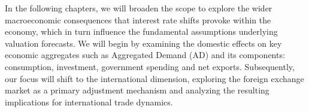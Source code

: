 In the following chapters, we will broaden the scope to explore the wider macroeconomic consequences that interest rate shifts provoke within the economy, which in turn influence the fundamental assumptions underlying valuation forecasts. We will begin by examining the domestic effects on key economic aggregates such as Aggregated Demand (AD) and its components: consumption, investment, government spending and net exports. Subsequently, our focus will shift to the international dimension, exploring the foreign exchange market as a primary adjustment mechanism and analyzing the resulting implications for international trade dynamics.
